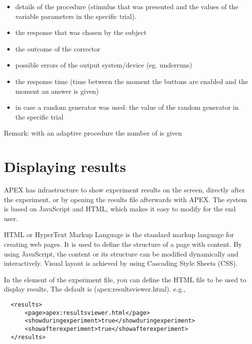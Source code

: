 \begin{itemize}
\item details of the procedure (stimulus that was presented and
the values of the variable parameters in the specific trial).

\item the response that was chosen by the subject

\item the outcome of the corrector

\item possible errors of the output system/device (eg. underruns)

\item the response time (time between the moment the buttons are
 enabled and the moment an answer is given)


\item in case a random generator was used: the value of the random
generator in the specific trial
\end{itemize}

Remark: with an adaptive procedure the number of
 is given


\section{Displaying results}

APEX has infrastructure to show experiment results on the screen, directly after the experiment, or by opening the results file afterwards with APEX. The system is based on JavaScript and HTML, which makes it easy to modify for the end user.

HTML or HyperText Markup Language is the standard markup language for creating web pages. It is used to define the structure of a page with content. By using JavaScript, the content or its structure can be modified dynamically and interactively. Visual layout is achieved by using Cascading Style Sheets (CSS).

In the  element of the experiment file, you can define the HTML file to be used to display results, The default is \xml(apex:resultsviewer.html). e.g.,

\begin{lstlisting}
  <results>
      <page>apex:resultsviewer.html</page>
      <showduringexperiment>true</showduringexperiment>
      <showafterexperiment>true</showafterexperiment>
  </results>
\end{lstlisting}

